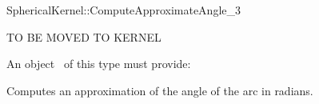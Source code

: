 \begin{ccRefFunctionObjectConcept}{SphericalKernel::ComputeApproximateAngle_3}

TO BE MOVED TO KERNEL

An object \ccVar\ of this type must provide:

{Computes an approximation of the angle of the arc in radians.}

\end{ccRefFunctionObjectConcept}
